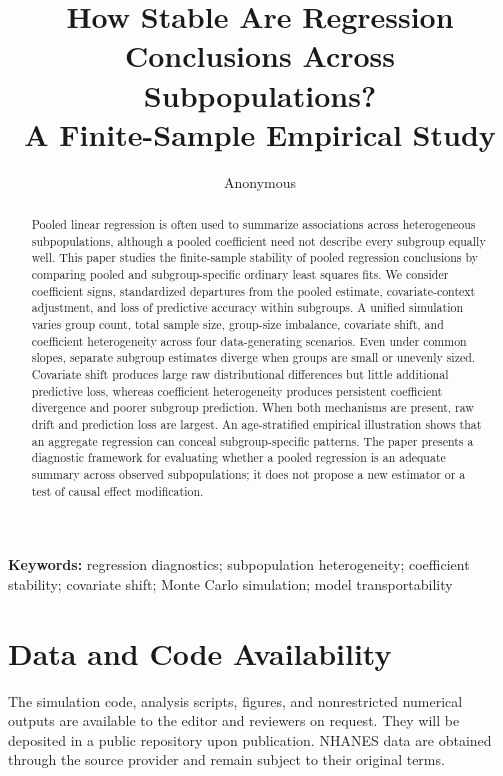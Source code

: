 \documentclass[11pt]{article}
\title{How Stable Are Regression Conclusions Across Subpopulations?\\A Finite-Sample Empirical Study}
\author{Anonymous}
\date{}
\begin{document}
\maketitle

\begin{abstract}
Pooled linear regression is often used to summarize associations across heterogeneous subpopulations, although a pooled coefficient need not describe every subgroup equally well. This paper studies the finite-sample stability of pooled regression conclusions by comparing pooled and subgroup-specific ordinary least squares fits. We consider coefficient signs, standardized departures from the pooled estimate, covariate-context adjustment, and loss of predictive accuracy within subgroups. A unified simulation varies group count, total sample size, group-size imbalance, covariate shift, and coefficient heterogeneity across four data-generating scenarios. Even under common slopes, separate subgroup estimates diverge when groups are small or unevenly sized. Covariate shift produces large raw distributional differences but little additional predictive loss, whereas coefficient heterogeneity produces persistent coefficient divergence and poorer subgroup prediction. When both mechanisms are present, raw drift and prediction loss are largest. An age-stratified empirical illustration shows that an aggregate regression can conceal subgroup-specific patterns. The paper presents a diagnostic framework for evaluating whether a pooled regression is an adequate summary across observed subpopulations; it does not propose a new estimator or a test of causal effect modification.
\end{abstract}

\noindent\textbf{Keywords:} regression diagnostics; subpopulation heterogeneity; coefficient stability; covariate shift; Monte Carlo simulation; model transportability








\section*{Data and Code Availability}
The simulation code, analysis scripts, figures, and nonrestricted numerical outputs are available to the editor and reviewers on request. They will be deposited in a public repository upon publication. NHANES data are obtained through the source provider and remain subject to their original terms.
\end{document}
